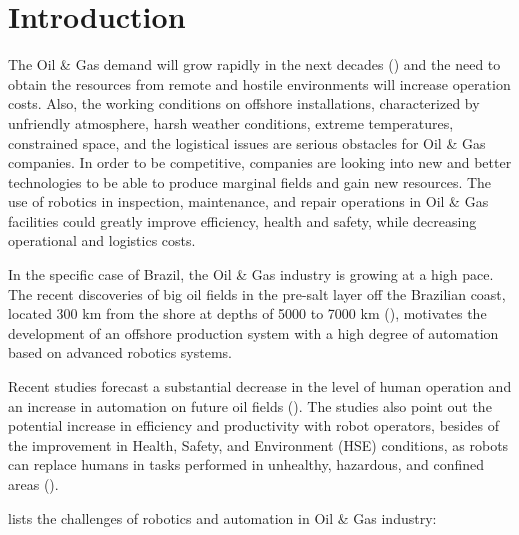 \section{Introduction}
The Oil \& Gas demand will grow rapidly in the next decades (\cite{wna}) and the
need to obtain the resources from remote and hostile environments will increase
operation costs. Also, the working conditions on offshore installations,
characterized by unfriendly atmosphere, harsh weather conditions,
extreme temperatures, constrained space, and the logistical issues are serious obstacles for Oil \& Gas companies. In order to be competitive, companies are looking into new and better technologies to be able to produce marginal fields and gain new resources. The use of robotics in inspection, maintenance, and repair operations in Oil \& Gas facilities could greatly improve efficiency, health and safety, while decreasing operational and logistics costs.

In the specific case of Brazil, the Oil \& Gas industry is growing at a high
pace. The recent discoveries of big oil fields in the pre-salt layer off the
Brazilian coast, located 300 km from the shore at depths of 5000 to 7000 km (\cite{presal}),
motivates the development of an offshore  production system with a high degree
of automation based on advanced robotics systems.


Recent studies forecast a substantial decrease in the level of human operation
and an increase in automation on future oil fields (\cite{skourup2009robotized}).
The studies also point out the potential increase
in efficiency and productivity with robot operators, besides of the improvement in
Health, Safety, and Environment (HSE) conditions, as robots can replace humans
in tasks performed in unhealthy, hazardous, and confined areas (\cite{pal}).

\cite{chen} lists the challenges of robotics and automation in Oil
\& Gas industry:%

